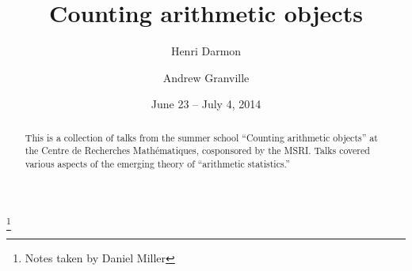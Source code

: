 \documentclass[english,letterpaper]{smfart}
\author{Henri Darmon}
\author{Andrew Granville}
\title{Counting arithmetic objects}
\date{June 23 -- July 4, 2014}
\begin{document}
\frontmatter

\begin{abstract}
This is a collection of talks from the summer school ``Counting arithmetic 
objects'' at the Centre de Recherches Math\'ematiques, cosponsored by the 
MSRI. Talks covered various aspects of the emerging theory of ``arithmetic 
statistics.'' 
\end{abstract}

\thanks{Notes taken by Daniel Miller}

\maketitle
\tableofcontents
\mainmatter












\backmatter


\end{document}
